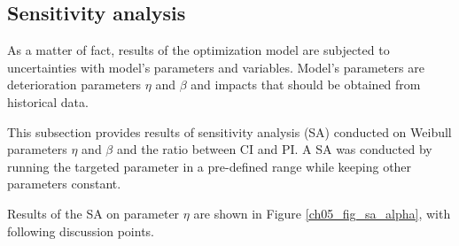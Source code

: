 \subsection{Sensitivity analysis}
As a matter of fact, results of the optimization model are subjected to uncertainties with model's parameters and variables. Model's parameters are deterioration parameters $\eta$ and $\beta$ and impacts that should be obtained from historical data.

This subsection provides results of sensitivity analysis (SA) conducted on Weibull parameters $\eta$ and $\beta$ and the ratio between CI and PI. A SA was conducted by running the targeted parameter in a pre-defined range while keeping other parameters constant.

Results of the SA on parameter $\eta$ are shown in Figure \ref{ch05_fig_sa_alpha}, with following discussion points.

